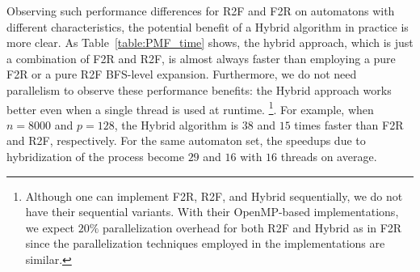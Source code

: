 \documentclass[12pt]{article}
\begin{document}
Observing such performance differences for R2F and F2R on automatons with different characteristics, the potential benefit of a Hybrid algorithm in practice is more clear. As Table~\ref{table:PMF_time} shows, the hybrid approach, which is just a combination of F2R and R2F, is almost always faster than employing a pure F2R or a pure R2F BFS-level expansion. Furthermore, we do not need parallelism to observe these performance benefits: the Hybrid approach works better even when a single thread is used at runtime. \footnote{Although one can implement F2R, R2F, and Hybrid sequentially, we do not have their sequential variants. With their OpenMP-based implementations, we expect $20\%$ parallelization overhead for both R2F and Hybrid as in F2R since the parallelization techniques employed in the implementations  are similar.}. For example, when $n = 8000$ and $p = 128$, the Hybrid algorithm is $38$ and $15$ times faster than F2R and R2F, respectively. For the same automaton set, the speedups due to hybridization of the process become $29$ and $16$ with $16$ threads on average.
\end{document}
